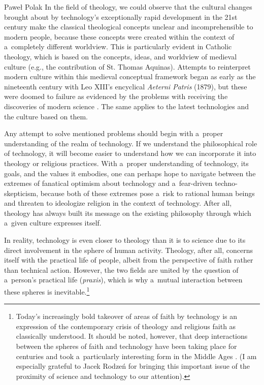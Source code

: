 \begin{artengenv}{Paweł Polak}
In the field of theology, we could observe that the cultural changes brought about by technology's exceptionally rapid development in the 21st century make the classical theological concepts unclear and incomprehensible to modern people, because these concepts were created within the context of a~completely different worldview. This is particularly evident in Catholic theology, which is based on the concepts, ideas, and worldview of medieval culture (e.g., the contribution of St. Thomas Aquinas). Attempts to reinterpret modern culture within this medieval conceptual framework began as early as the nineteenth century with Leo XIII's encyclical \textit{Aeterni Patris} (1879), but these were doomed to failure as evidenced by the problems with receiving the discoveries of modern science 
\parencite[][]{polak_theory_2023}. %
 The same applies to the latest technologies and the culture based on them.



Any attempt to solve mentioned problems should begin with a~proper understanding of the realm of technology. If we understand the philosophical role of technology, it will become easier to understand how we can incorporate it into theology or religious practices. With a~proper understanding of technology, its goals, and the values it embodies, one can perhaps hope to navigate between the extremes of fanatical optimism about technology and a~fear-driven techno-skepticism, because both of these extremes pose a~risk to rational human beings and threaten to ideologize religion in the context of technology. After all, theology has always built its message on the existing philosophy through which a~given culture expresses itself.



In reality, technology is even closer to theology than it is to science due to its direct involvement in the sphere of human activity. Theology, after all, concerns itself with the practical life of people, albeit from the perspective of faith rather than technical action. However, the two fields are united by the question of a~person's practical life (\textit{praxis}), which is why a~mutual interaction between these spheres is inevitable.\footnote{Today's increasingly bold takeover of areas of faith by technology 
\parencite[see.g.][]{wildman_spirit_2021} %
 is an expression of the contemporary crisis of theology and religious faith as classically understood. It should be noted, however, that deep interactions between the spheres of faith and technology have been taking place for centuries and took a~particularly interesting form in the Middle Ages 
\parencite[][]{ovitt_restoration_1987}. %
 (I am especially grateful to Jacek Rodzeń for bringing this important issue of the proximity of science and technology to our attention).}




\end{artengenv}
